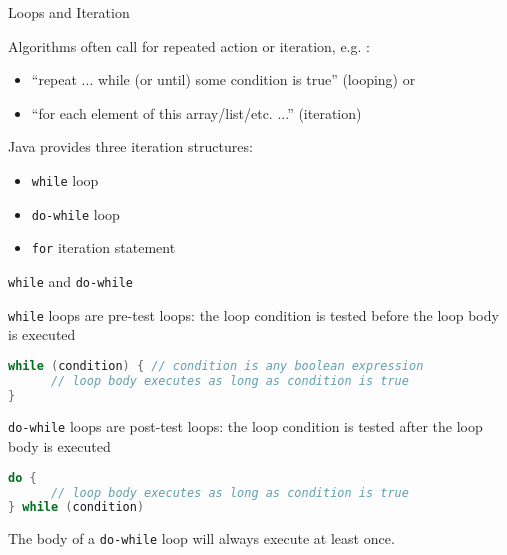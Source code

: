 \documentclass{beamer}
\author[Chris Simpkins] 
{Christopher Simpkins \\\texttt{chris.simpkins@gatech.edu}}
\institute[Georgia Tech] %
\date{}
\begin{document}
\begin{frame}
  \titlepage
\end{frame}



\begin{frame}[fragile]{Loops and Iteration}


Algorithms often call for repeated action or iteration, e.g. :
\begin{itemize}
\item ``repeat ... while (or until) some condition is true'' (looping) or 
\item ``for each element of this array/list/etc. ...'' (iteration)
\end{itemize}

Java provides three iteration structures:
\begin{itemize}
\item {\tt while} loop
\item {\tt do-while} loop
\item {\tt for} iteration statement
\end{itemize}


\end{frame}

\begin{frame}[fragile]{{\tt while} and {\tt do-while}}

{\tt while} loops are pre-test loops: the loop condition is tested before the loop body is executed
\begin{lstlisting}[language=Java]
while (condition) { // condition is any boolean expression
      // loop body executes as long as condition is true
}
\end{lstlisting}

{\tt do-while} loops are post-test loops: the loop condition is tested after the loop body is executed
\begin{lstlisting}[language=Java]
do {
      // loop body executes as long as condition is true
} while (condition)
\end{lstlisting}
The body of a {\tt do-while} loop will always execute at least once.

\end{frame}
\end{document}
